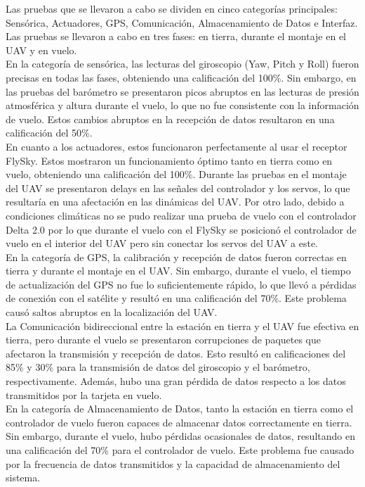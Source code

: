         Las pruebas que se llevaron a cabo se dividen en cinco categorías principales: Sensórica, Actuadores, GPS, Comunicación, Almacenamiento de Datos e Interfaz. Las pruebas se llevaron a cabo en tres fases: en tierra, durante el montaje en el UAV y en vuelo.\\


        En la categoría de sensórica, las lecturas del giroscopio (Yaw, Pitch y Roll) fueron precisas en todas las fases, obteniendo una calificación del 100\%. Sin embargo, en las pruebas del barómetro se presentaron picos abruptos en las lecturas de presión atmosférica y altura durante el vuelo, lo que no fue consistente con la información de vuelo. Estos cambios abruptos en la recepción de datos resultaron en una calificación del 50\%.\\

        En cuanto a los actuadores, estos funcionaron perfectamente al usar el receptor FlySky. Estos mostraron un funcionamiento óptimo tanto en tierra como en vuelo, obteniendo una calificación del 100\%. Durante las pruebas en el montaje del UAV se presentaron delays en las señales del controlador y los servos, lo que resultaría en una afectación en las dinámicas del UAV. Por otro lado, debido a condiciones climáticas no se pudo realizar una prueba de vuelo con el controlador Delta 2.0 por lo que durante el vuelo con el FlySky se posicionó el controlador de vuelo en el interior del UAV pero sin conectar los servos del UAV a este.\\

        En la categoría de GPS, la calibración y recepción de datos fueron correctas en tierra y durante el montaje en el UAV. Sin embargo, durante el vuelo, el tiempo de actualización del GPS no fue lo suficientemente rápido, lo que llevó a pérdidas de conexión con el satélite y resultó en una calificación del 70\%. Este problema causó saltos abruptos en la localización del UAV.\\

        La Comunicación bidireccional entre la estación en tierra y el UAV fue efectiva en tierra, pero durante el vuelo se presentaron corrupciones de paquetes que afectaron la transmisión y recepción de datos. Esto resultó en calificaciones del 85\% y 30\% para la transmisión de datos del giroscopio y el barómetro, respectivamente. Además, hubo una gran pérdida de datos respecto a los datos transmitidos por la tarjeta en vuelo.\\

        En la categoría de Almacenamiento de Datos, tanto la estación en tierra como el controlador de vuelo fueron capaces de almacenar datos correctamente en tierra. Sin embargo, durante el vuelo, hubo pérdidas ocasionales de datos, resultando en una calificación del 70\% para el controlador de vuelo. Este problema fue causado por la frecuencia de datos transmitidos y la capacidad de almacenamiento del sistema.\\

